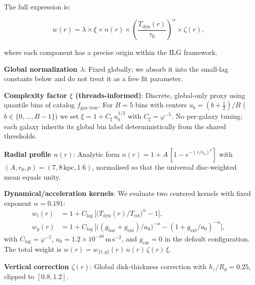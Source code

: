 \documentclass[12pt,a4paper]{article}
\begin{document}
The full expression is:

\begin{equation}
w(r) = \lambda \times \xi \times n(r) \times \left(\frac{T_\mathrm{dyn}(r)}{\tau_0}\right)^\alpha \times \zeta(r),
\end{equation}

where each component has a precise origin within the ILG framework.

\textbf{Global normalization $\lambda$}: Fixed globally; we absorb it into the small-lag constants below and do not treat it as a free fit parameter.

\textbf{Complexity factor $\xi$ (threads-informed)}: Discrete, global-only proxy using quantile bins of catalog $f_\mathrm{gas,true}$. For $B=5$ bins with centers $u_b=(b+\tfrac{1}{2})/B$ ($b\in\{0,\dots,B{-}1\}$) we set $\xi = 1 + C_\xi\,u_b^{1/2}$ with $C_\xi = \varphi^{-5}$. No per-galaxy tuning; each galaxy inherits its global bin label deterministically from the shared thresholds.

\textbf{Radial profile $n(r)$}: Analytic form $n(r) = 1 + A\,[1 - e^{-(r/r_0)^p}]$ with $(A, r_0, p) = (7, 8\,\mathrm{kpc}, 1.6)$, normalised so that the universal disc-weighted mean equals unity.

\textbf{Dynamical/acceleration kernels}: We evaluate two centered kernels with fixed exponent $\alpha = 0.191$:
\begin{align}
w_t(r) &= 1 + C_\mathrm{lag}\,\Big[\big(T_\mathrm{dyn}(r)/T_\mathrm{ref}\big)^{\alpha} - 1\Big],\\
w_g(r) &= 1 + C_\mathrm{lag}\,\Big[\big((g_\mathrm{bar}+g_\mathrm{ext})/a_0\big)^{-\alpha} - (1+g_\mathrm{ext}/a_0)^{-\alpha}\Big],
\end{align}
with $C_\mathrm{lag} = \varphi^{-5}$, $a_0 = 1.2\times10^{-10}\,\mathrm{m\,s^{-2}}$, and $g_\mathrm{ext}=0$ in the default configuration. The total weight is $w(r) = w_{\{t,g\}}(r)\, n(r)\,\zeta(r)\,\xi$.

\textbf{Vertical correction $\zeta(r)$}: Global disk-thickness correction with $h_z/R_d = 0.25$, clipped to $[0.8, 1.2]$.
\end{document}
